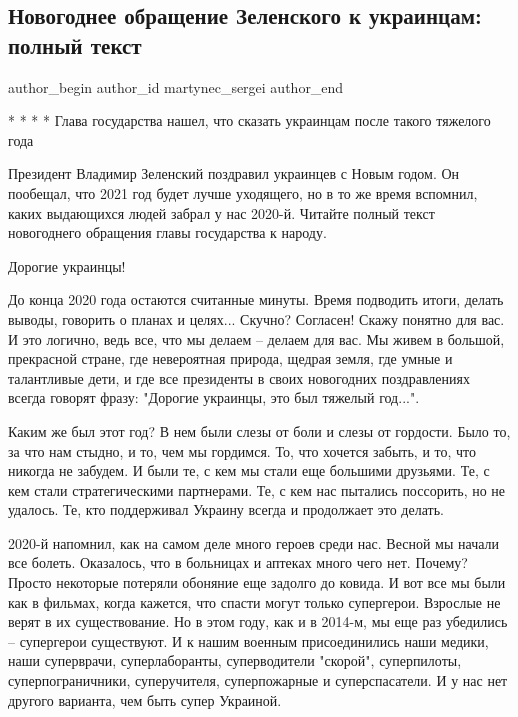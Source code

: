 
 
 
 
 
 
\subsection{Новогоднее обращение Зеленского к украинцам: полный текст}
\label{sec:31_12_2020.news.ua.segodnya_ua.martynec_sergei.1.zelenskii_new_year}
\ifcmt
	author_begin
   author_id martynec_sergei
	author_end
\fi

* *  *  * Глава государства нашел, что сказать украинцам после такого тяжелого года

Президент Владимир Зеленский поздравил украинцев с Новым годом. Он
пообещал, что 2021 год будет лучше уходящего, но в то же время вспомнил,
каких выдающихся людей забрал у нас 2020-й. Читайте полный текст
новогоднего обращения главы государства к народу.


Дорогие украинцы!

До конца 2020 года остаются считанные минуты. Время подводить итоги,
делать выводы, говорить о планах и целях... Скучно? Согласен! Скажу
понятно для вас. И это логично, ведь все, что мы делаем – делаем для вас.
Мы живем в большой, прекрасной стране, где невероятная природа, щедрая
земля, где умные и талантливые дети, и где все президенты в своих
новогодних поздравлениях всегда говорят фразу: "Дорогие украинцы, это был
тяжелый год...".

Каким же был этот год? В нем были слезы от боли и слезы от гордости. Было
то, за что нам стыдно, и то, чем мы гордимся. То, что хочется забыть, и
то, что никогда не забудем. И были те, с кем мы стали еще большими
друзьями. Те, с кем стали стратегическими партнерами. Те, с кем нас
пытались поссорить, но не удалось. Те, кто поддерживал Украину всегда и
продолжает это делать.

2020-й напомнил, как на самом деле много героев среди нас. Весной мы
начали все болеть. Оказалось, что в больницах и аптеках много чего нет.
Почему? Просто некоторые потеряли обоняние еще задолго до ковида. И вот
все мы были как в фильмах, когда кажется, что спасти могут только
супергерои. Взрослые не верят в их существование. Но в этом году, как и в
2014-м, мы еще раз убедились – супергерои существуют. И к нашим военным
присоединились наши медики, наши суперврачи, суперлаборанты, суперводители
"скорой", суперпилоты, суперпограничники, суперучителя, суперпожарные и
суперспасатели. И у нас нет другого варианта, чем быть супер Украиной.

